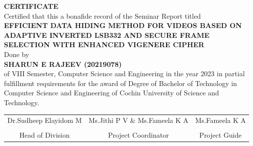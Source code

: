 \documentclass[a4paper,oneside,10pt]{report}
\begin{document}
    {\huge \textbf{CERTIFICATE}} \\[3\baselineskip]
    Certified that this a bonafide record of the Seminar Report titled
    \\[3\baselineskip]
    \Large{
        \bfseries EFFICIENT DATA HIDING METHOD FOR VIDEOS BASED ON ADAPTIVE INVERTED LSB332 AND SECURE FRAME SELECTION WITH ENHANCED VIGENERE CIPHER \\[2\baselineskip]
    }
    \large{
        Done by \\
        \bfseries{
            SHARUN E RAJEEV (20219078) \\[3\baselineskip]
        }
    }
    \normalsize of VIII Semester, Computer Science and Engineering in the year 2023 in partial fulfillment requirements for the award of Degree of Bachelor of Technology in Computer Science and Engineering of Cochin University of Science and Technology. \\[6\baselineskip]
    \begin{center}
        \begin{tabular}{c c c}
            Dr.Sudheep Elayidom M & Ms.Jithi P V \& Ms.Fameela K A & Ms.Fameela K A \\
            \\[6\baselineskip]
            Head of Division & Project Coordinator & Project Guide
        \end{tabular}
    \hspace{0pt}
    \vfill
    \end{center}
    
\end{document}

